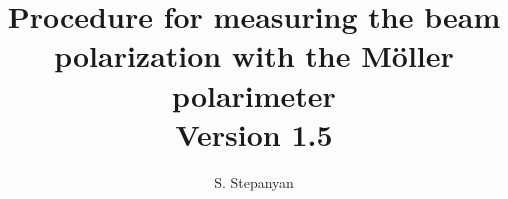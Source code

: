 \documentclass[12pt]{article}
\newcommand{\versionnumber}{1.5}
\begin{document}
\title{Procedure for measuring the beam polarization with the M{\"o}ller polarimeter\\\normalsize Version \versionnumber}
\author{S. Stepanyan}
\maketitle

\end{document}
